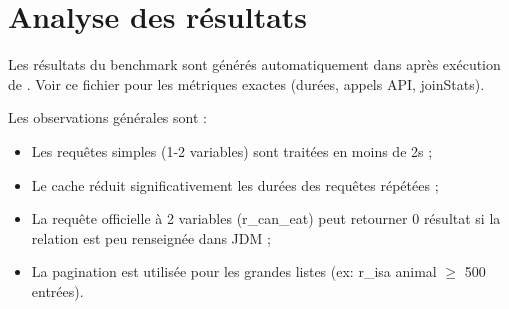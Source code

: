\section{Analyse des résultats}

Les résultats du benchmark sont générés automatiquement dans  après exécution de . Voir ce fichier pour les métriques exactes (durées, appels API, joinStats).

Les observations générales sont :
\begin{itemize}
    \item Les requêtes simples (1-2 variables) sont traitées en moins de 2s ;
    \item Le cache réduit significativement les durées des requêtes répétées ;
    \item La requête officielle à 2 variables (r\_can\_eat) peut retourner 0 résultat si la relation est peu renseignée dans JDM ;
    \item La pagination est utilisée pour les grandes listes (ex: r\_isa animal $\geq$ 500 entrées).
\end{itemize}
